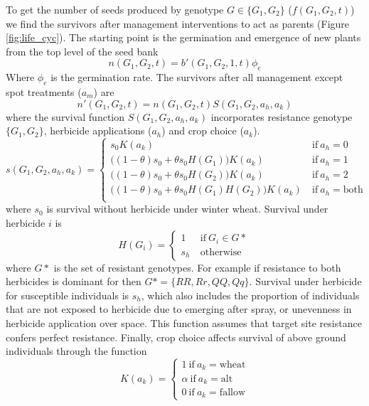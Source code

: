 \documentclass[12pt, a4paper]{article}
\begin{document}
To get the number of seeds produced by genotype $G \in \{G_1, G_2\}$ ($f(G_1, G_2, t)$) we find the survivors after management interventions to act as parents (Figure \ref{fig:life_cyc}). The starting point is the germination and emergence of new plants from the top level of the seed bank
\begin{equation}\label{eq:ag}
	n(G_1, G_2, t) = b'(G_1, G_2, 1, t)\phi_e
\end{equation}
Where $\phi_e$ is the germination rate. The survivors after all management except spot treatments ($a_m$) are
\begin{equation}\label{eq:ab_sur}
	n'(G_1, G_2, t) = n(G_1, G_2, t)S(G_1, G_2, a_h, a_k) 
\end{equation}
where the survival function $S(G_1, G_2, a_h, a_k)$ incorporates resistance genotype $\{G_1, G_2\}$, herbicide applications ($a_h$) and crop choice ($a_k$).
\begin{equation}\label{eq:sur}
	s(G_1, G_2, a_h, a_k) = \begin{cases}
		s_0 K(a_k) &~\text{if} ~ a_h = 0 \\
		\big((1 - \theta)s_0 + \theta s_0 H(G_1)\big) K(a_k) &~\text{if}~a_h = 1 \\
		\big((1 - \theta)s_0 + \theta s_0 H(G_2) \big) K(a_k) &~ \text{if} ~ a_h = 2 \\
		\big((1 - \theta)s_0 + \theta s_0 H(G_1) H(G_2)\big) K(a_k) &~ \text{if} ~ a_h = \text{both} \\	
	\end{cases} 
\end{equation}
where $s_0$ is survival without herbicide under winter wheat. Survival under herbicide $i$ is 
\begin{equation}
	H(G_i) = \begin{cases}
		1 &~\text{if}~G_i \in G*\\
		s_h &~\text{otherwise}
	\end{cases}
\end{equation}
where $G*$ is the set of resistant genotypes. For example if resistance to both herbicides is dominant for then $G* = \{RR, Rr, QQ, Qq\}$. Survival under herbicide for susceptible individuals is $s_h$, which also includes the proportion of individuals that are not exposed to herbicide due to emerging after spray, or unevenness in herbicide application over space. This function assumes that target site resistance confers perfect resistance. Finally, crop choice affects survival of above ground individuals through the function
\begin{equation}
	K(a_k) = \begin{cases}
		1~\text{if}~a_k = \text{wheat}\\
		\alpha~\text{if}~a_k = \text{alt}\\
		0~\text{if}~a_k = \text{fallow}		
	\end{cases}
\end{equation}	
\end{document}
